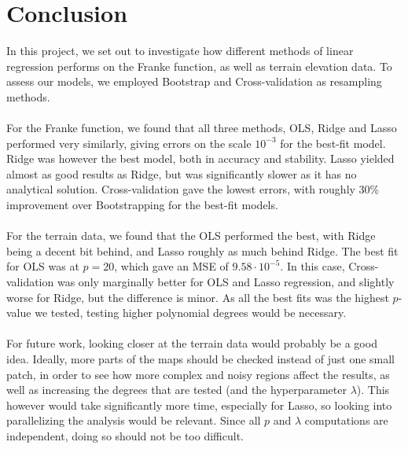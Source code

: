 \documentclass[a4paper]{article}
\newcommand\red[1]{\textcolor{red}{\textbf{#1}}}
\begin{document}
\section{Conclusion} \label{chap:conclusion}
In this project, we set out to investigate how different methods of linear regression performs on the Franke function, as well as terrain elevation data. To assess our models, we employed Bootstrap and Cross-validation as resampling methods.
\\\\
For the Franke function, we found that all three methods, OLS, Ridge and Lasso performed very similarly, giving errors on the scale $10^{-3}$ for the best-fit model. Ridge was however the best model, both in accuracy and stability. Lasso yielded almost as good results as Ridge, but was significantly slower as it has no analytical solution. Cross-validation gave the lowest errors, with roughly 30\% improvement over Bootstrapping for the best-fit models.
\\\\
For the terrain data, we found that the OLS performed the best, with Ridge being a decent bit behind, and Lasso roughly as much behind Ridge. The best fit for OLS was at $p=20$, which gave an MSE of $9.58\cdot10^{-5}$. In this case, Cross-validation was only marginally better for OLS and Lasso regression, and slightly worse for Ridge, but the difference is minor. As all the best fits was the highest $p$-value we tested, testing higher polynomial degrees would be necessary.
\\\\
For future work, looking closer at the terrain data would probably be a good idea. Ideally, more parts of the maps should be checked instead of just one small patch, in order to see how more complex and noisy regions affect the results, as well as increasing the degrees that are tested (and the hyperparameter $\lambda$). This however would take significantly more time, especially for Lasso, so looking into parallelizing the analysis would be relevant. Since all $p$ and $\lambda$ computations are independent, doing so should not be too difficult.

\appendix
\end{document}
